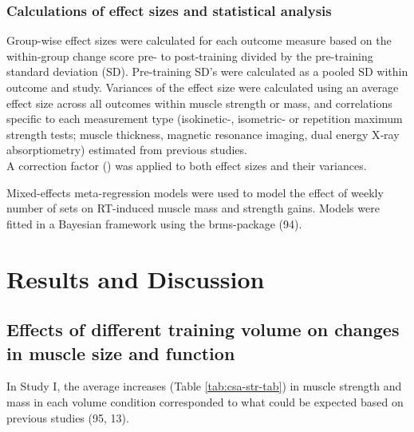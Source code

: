 \documentclass[twoside,10pt]{gihclass} %
\begin{document}
\hypertarget{calculations-of-effect-sizes-and-statistical-analysis}{%
\subsection{Calculations of effect sizes and statistical analysis}\label{calculations-of-effect-sizes-and-statistical-analysis}}

Group-wise effect sizes were calculated for each outcome measure based
on the within-group change score pre- to post-training divided by the
pre-training standard deviation (SD). Pre-training SD's were calculated
as a pooled SD within outcome and study. Variances of the effect size
were calculated using an average effect size across all outcomes within
muscle strength or mass, and correlations specific to each measurement
type (isokinetic-, isometric- or repetition maximum strength tests;
muscle thickness, magnetic resonance imaging, dual energy X‐ray
absorptiometry) estimated from previous studies.\\
A correction factor () was applied to both effect sizes and their
variances.

Mixed-effects meta-regression models were used to model the effect of
weekly number of sets on RT-induced muscle mass and strength gains.
Models were fitted in a Bayesian framework using the brms-package
(94).

\hypertarget{results-and-discussion}{%
\chapter{Results and Discussion}\label{results-and-discussion}}

\hypertarget{effects-of-different-training-volume-on-changes-in-muscle-size-and-function}{%
\section{Effects of different training volume on changes in muscle size and function}\label{effects-of-different-training-volume-on-changes-in-muscle-size-and-function}}

In Study I, the average increases (Table \ref{tab:csa-str-tab}) in muscle strength and mass in each volume condition corresponded to what could be expected based on previous studies
(95, 13).
\end{document}

